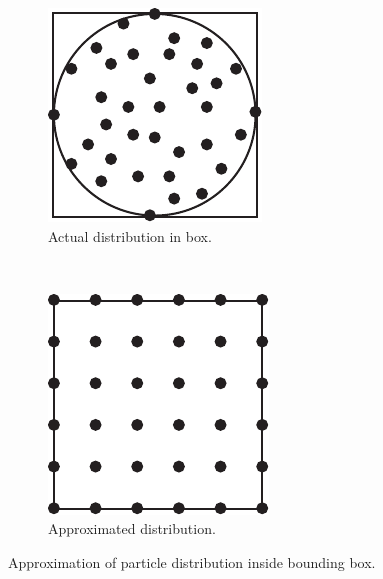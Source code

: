 \newcommand{\figwidth}{0.21\textwidth}
\begin{figure}[H]
	\centering
	\begin{subfigure}[b]{\figwidth}
		\includegraphics[width=\textwidth]{img/Circle.pdf}
		\caption{Actual distribution in box.}
		\label{fig:distr_true}
	\end{subfigure}
	~
	\begin{subfigure}[b]{\figwidth}
		\includegraphics[width=\textwidth]{img/Square.pdf}
		\caption{Approximated distribution.}
		\label{fig:distr_approx}
	\end{subfigure}
	\caption{Approximation of particle distribution inside bounding box.}
	\label{fig:distr}
\end{figure}

